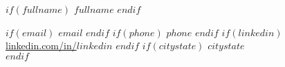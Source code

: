 \begin{center}
$if(fullname)$
{\fontsize{18}{0}\selectfont\scshape $fullname$ \vspace{-0.1in}}
$endif$
\end{center}
\begin{center}
$if(email)$
\href{mailto: $email$}{\faEnvelope\enspace $email$}\hfill
$endif$
$if(phone)$
\href{tel: $phone$}{\faPhone\enspace $phone$}\hfill
$endif$
$if(linkedin)$
\href{https://linkedin.com/in/$linkedin$}{\faLinkedinIn\enspace linkedin.com/in/$linkedin$}\hfill
$endif$
$if(citystate)$
\faMapMarker\enspace $citystate$\\
$endif$
\noindent\makebox[\linewidth]{\rule{\textwidth}{0.5pt}}
\end{center}
\renewcommand{\labelitemi}{-}